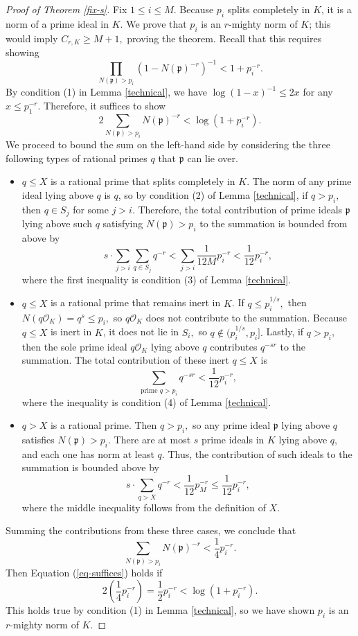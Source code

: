 \documentclass[12pt]{amsart}
\theoremstyle{definition}
\numberwithin{equation}{section}
\begin{document}
\begin{proof}[Proof of Theorem \ref{fix-s}]
    Fix $1 \leq i \leq M.$ Because $p_i$ splits completely in $K$, it is a norm of a prime ideal in $K$. We prove that $p_i$ is an $r$-mighty norm of $K$; this would imply $C_{r,K} \geq M+1,$ proving the theorem. Recall that this requires showing $$\prod_{N(\mathfrak p) > p_i} (1 - N(\mathfrak p)^{-r})^{-1} < 1 + p_i^{-r}.$$ By condition (1) in Lemma \ref{technical}, we have $\log(1-x)^{-1} \leq 2x$ for any $x \leq p_1^{-r}.$ Therefore, it suffices to show \begin{equation} \label{eq-suffices}
        2 \sum_{N(\mathfrak p) > p_i} N(\mathfrak p)^{-r} < \log(1 + p_i^{-r}).
    \end{equation} We proceed to bound the sum on the left-hand side by considering the three following types of rational primes $q$ that $\mathfrak p$ can lie over. 
    \begin{itemize}
        \item $q \leq X$ is a rational prime that splits completely in $K$. The norm of any prime ideal lying above $q$ is $q$, so by condition (2) of Lemma \ref{technical}, if $q > p_i,$ then $q \in S_j$ for some $j > i$. Therefore, the total contribution of prime ideals $\mathfrak p$ lying above such $q$ satisfying $N(\mathfrak p) > p_i$ to the summation is bounded from above by $$s \cdot \sum_{j > i} \sum_{q \in S_j} q^{-r} < \sum_{j > i} \frac{1}{12M} p_i^{-r} < \frac{1}{12}p_i^{-r},$$ where the first inequality is condition (3) of Lemma \ref{technical}.
        \item $q \leq X$ is a rational prime that remains inert in $K$. If $q \leq p_i^{1/s},$ then $N(q\mathcal O_K) = q^s \leq p_i,$ so $q \mathcal O_K$ does not contribute to the summation. Because $q \leq X$ is inert in $K$, it does not lie in $S_i,$ so $q \not\in (p_i^{1/s}, p_i].$ Lastly, if $q > p_i$, then the sole prime ideal $q \mathcal O_K$ lying above $q$ contributes $q^{-sr}$ to the summation. The total contribution of these inert $q \leq X$ is $$\sum_{\text{prime }q > p_i} q^{-sr} < \frac{1}{12} p_i^{-r},$$ where the inequality is condition (4) of Lemma \ref{technical}.
        \item $q > X$ is a rational prime. Then $q > p_i,$ so any prime ideal $\mathfrak p$ lying above $q$ satisfies $N(\mathfrak p) > p_i.$ There are at most $s$ prime ideals in $K$ lying above $q$, and each one has norm at least $q$. Thus, the contribution of such ideals to the summation is bounded above by $$s \cdot \sum_{q > X} q^{-r} < \frac{1}{12} p_M^{-r} \leq \frac{1}{12} p_i^{-r},$$ where the middle inequality follows from the definition of $X$.  
    \end{itemize}
    Summing the contributions from these three cases, we conclude that $$\sum_{N(\mathfrak p) > p_i} N(\mathfrak p)^{-r} < \frac{1}{4} p_i^{-r}.$$ Then Equation (\ref{eq-suffices}) holds if $$2 \left(\frac{1}{4} p_i^{-r}\right) = \frac{1}{2} p_i^{-r} < \log(1 + p_i^{-r}).$$ This holds true by condition (1) in Lemma \ref{technical}, so we have shown $p_i$ is an $r$-mighty norm of $K$. 
\end{proof}
\end{document}
